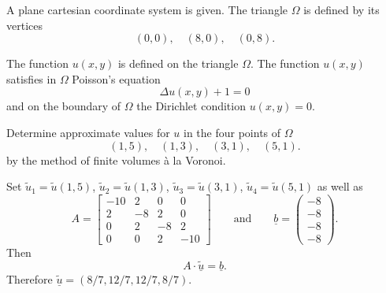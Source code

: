 A plane cartesian coordinate system is given.
The triangle $\Omega$ is defined by its vertices
\[
(0,0), \quad (8,0), \quad (0,8).
\]

\bigskip

The function $u(x,y)$ is defined on the triangle $\Omega$. 
The function $u(x,y)$ satisfies in $\Omega$ Poisson's equation
\[
\Delta u(x,y) + 1 = 0
\]
and on the boundary of $\Omega$ the Dirichlet condition $u(x,y) = 0$.

\bigskip

Determine approximate values for $u$ in the four points of $\Omega$ 
\[
(1,5), \quad  (1,3), \quad (3,1), \quad (5,1).
\]
by the method of finite volumes \`a la Voronoi.  

\begin{loesung}
Set
$\tilde u_1 = \tilde u(1,5)$,
$\tilde u_2 = \tilde u(1,3)$,
$\tilde u_3 = \tilde u(3,1)$,
$\tilde u_4 = \tilde u(5,1)$
as well as
\[
A
=
\left[
\begin{array}{rrrr}
-10 &  2 &  0 &  0 \\
  2 & -8 &  2 &  0 \\
  0 &  2 & -8 &  2 \\
  0 &  0 &  2 & -10
\end{array}
\right] \qquad \text{and} \qquad
\underline{b}
=
\left(
\begin{array}{r}
-8\\
-8\\
-8\\
-8 
\end{array}
\right).
\]
Then 
\[
A \cdot \underline{\tilde u} = \underline{b}.
\]
Therefore
$\underline{\tilde u} = (8/7, 12/7, 12/7, 8/7)$.
\end{loesung}



